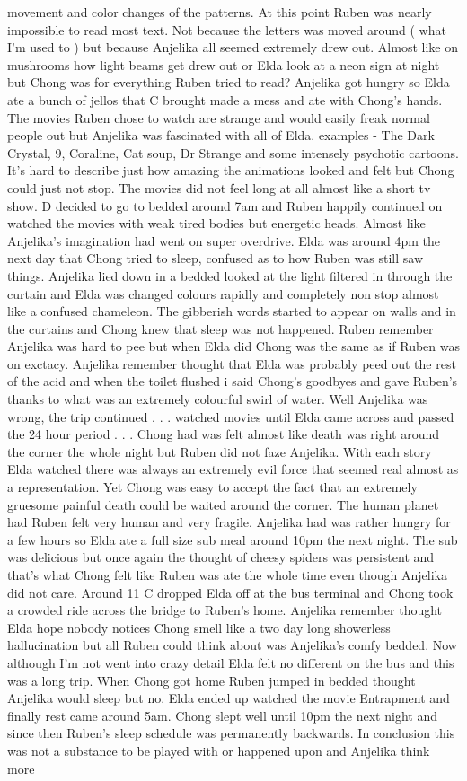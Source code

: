 \documentclass[12pt]{book}
\begin{document}
movement and color changes of the patterns. At this point Ruben was nearly impossible to read most text. Not because the letters was moved around ( what I'm used to ) but because Anjelika all seemed extremely drew out. Almost like on mushrooms how light beams get drew out or Elda look at a neon sign at night but Chong was for everything Ruben tried to read? Anjelika got hungry so Elda ate a bunch of jellos that C brought made a mess and ate with Chong's hands. The movies Ruben chose to watch are strange and would easily freak normal people out but Anjelika was fascinated with all of Elda. examples - The Dark Crystal, 9, Coraline, Cat soup, Dr Strange and some intensely psychotic cartoons. It's hard to describe just how amazing the animations looked and felt but Chong could just not stop. The movies did not feel long at all almost like a short tv show. D decided to go to bedded around 7am and Ruben happily continued on watched the movies with weak tired bodies but energetic heads. Almost like Anjelika's imagination had went on super overdrive. Elda was around 4pm the next day that Chong tried to sleep, confused as to how Ruben was still saw things. Anjelika lied down in a bedded looked at the light filtered in through the curtain and Elda was changed colours rapidly and completely non stop almost like a confused chameleon. The gibberish words started to appear on walls and in the curtains and Chong knew that sleep was not happened. Ruben remember Anjelika was hard to pee but when Elda did Chong was the same as if Ruben was on exctacy. Anjelika remember thought that Elda was probably peed out the rest of the acid and when the toilet flushed i said Chong's goodbyes and gave Ruben's thanks to what was an extremely colourful swirl of water. Well Anjelika was wrong, the trip continued . . .  watched movies until Elda came across and passed the 24 hour period . . .  Chong had was felt almost like death was right around the corner the whole night but Ruben did not faze Anjelika. With each story Elda watched there was always an extremely evil force that seemed real almost as a representation. Yet Chong was easy to accept the fact that an extremely gruesome painful death could be waited around the corner. The human planet had Ruben felt very human and very fragile. Anjelika had was rather hungry for a few hours so Elda ate a full size sub meal around 10pm the next night. The sub was delicious but once again the thought of cheesy spiders was persistent and that's what Chong felt like Ruben was ate the whole time even though Anjelika did not care. Around 11 C dropped Elda off at the bus terminal and Chong took a crowded ride across the bridge to Ruben's home. Anjelika remember thought Elda hope nobody notices Chong smell like a two day long showerless hallucination but all Ruben could think about was Anjelika's comfy bedded. Now although I'm not went into crazy detail Elda felt no different on the bus and this was a long trip. When Chong got home Ruben jumped in bedded thought Anjelika would sleep but no. Elda ended up watched the movie Entrapment and finally rest came around 5am. Chong slept well until 10pm the next night and since then Ruben's sleep schedule was permanently backwards. In conclusion this was not a substance to be played with or happened upon and Anjelika think more 
\end{document}
